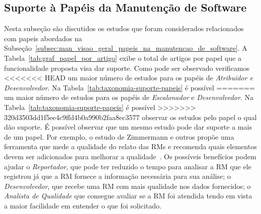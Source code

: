 \subsection{Suporte à Papéis da Manutenção de Software}
\label{sub:extensões_com_suporte_a_papeis}

Nesta subseção são discutidos os estudos que foram considerados relacionados
com papeis abordados na
Subseção~\ref{subsec:man_visao_geral_papeis_na_manutencao_de_software}. A
Tabela~\ref{tab:graf_papel_por_artigo} exibe o total de artigos por papel que a
funcionalidade proposta visa dar suporte.  Como pode ser observado verificamos
<<<<<<< HEAD
um maior número de estudos para os papéis de \textit{Atribuidor e
    Desenvolvedor}. Na Tabela~\ref{tab:taxonomia-suporte-papeis} é possível
=======
um maior número de estudos para os papéis de \textit{Escalonador} e
\textit{Desenvolvedor}. Na Tabela~\ref{tab:taxonomia-suporte-papeis} é possível
>>>>>>> 320d3503dd1f5ee4c9ffd4b0a990b2faa8ec3577
observar os estudos pelo papel o qual dão suporte. É possível observar que um
mesmo estudo pode dar suporte a mais de um papel. Por exemplo, o estudo de
Zimmermann e outros propõe uma ferramenta que mede a qualidade do relato das
RMs e recomenda quais elementos devem ser adicionados para melhorar a
qualidade~\cite{zimmermann2010makes}. Os possíveis benefícios podem ajudar o
\textit{Reportador}, que pode ter reduzido o tempo para analisar a RM que ele
registrou já que a RM fornece a informação necessária para sua análise; o
\textit{Desenvolvedor}, que recebe uma RM com mais qualidade nos dados
fornecidos; o \textit{Analista de Qualidade} que consegue avaliar se a RM foi
atendida tendo em vista a maior facilidade em entender o que foi solicitado.

\begin{table}[htpb]
\centering
{}
\caption{Total de artigos por papel na manutenção de software}
\label{tab:graf_papel_por_artigo}
\end{table}

